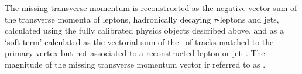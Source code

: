 The missing transverse momentum is reconstructed as the negative vector sum of the transverse momenta of leptons, hadronically decaying $\tau$-leptons and jets, calculated using the fully calibrated physics objects described above, and as a ‘soft term’ calculated as the vectorial sum of the \pt\ of tracks matched to the primary vertex but not associated to a reconstructed lepton or jet~\cite{Aaboud:2018tkc}. The magnitude of the missing transverse momentum vector ir referred to as \MET.
